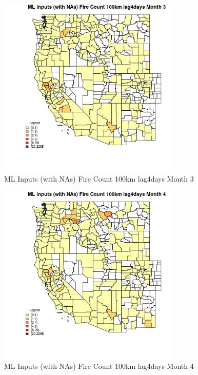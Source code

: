 \begin{figure} 
\centering  
\includegraphics[width=0.77\textwidth]{Code_Outputs/Report_ML_input_PM25_Step4_part_e_de_duplicated_aves_compiled_2019-05-20wNAs_CountyFire_Count_100km_lag4daysmedianMonth3.jpg} 
\caption{\label{fig:Report_ML_input_PM25_Step4_part_e_de_duplicated_aves_compiled_2019-05-20wNAsCountyFire_Count_100km_lag4daysmedianMonth3}ML Inputs (with NAs) Fire Count 100km lag4days Month 3} 
\end{figure} 
 

\begin{figure} 
\centering  
\includegraphics[width=0.77\textwidth]{Code_Outputs/Report_ML_input_PM25_Step4_part_e_de_duplicated_aves_compiled_2019-05-20wNAs_CountyFire_Count_100km_lag4daysmedianMonth4.jpg} 
\caption{\label{fig:Report_ML_input_PM25_Step4_part_e_de_duplicated_aves_compiled_2019-05-20wNAsCountyFire_Count_100km_lag4daysmedianMonth4}ML Inputs (with NAs) Fire Count 100km lag4days Month 4} 
\end{figure} 
 

